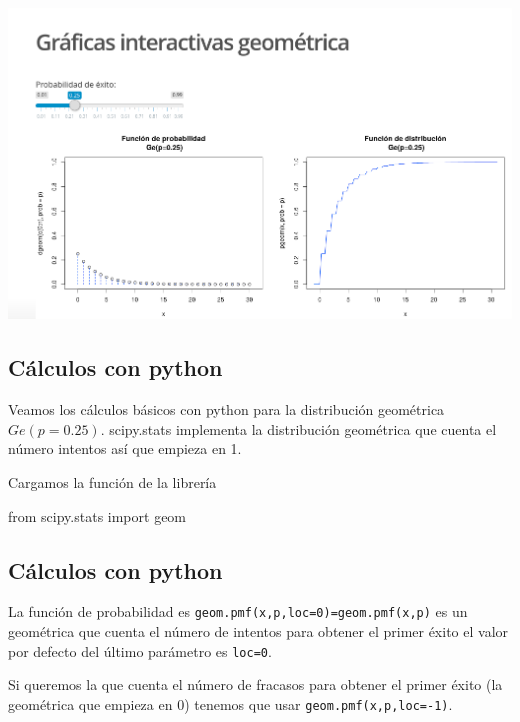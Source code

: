 \documentclass[]{book}
\newenvironment{Shaded}{\begin{snugshade}}{\end{snugshade}}
\newcommand{\ImportTok}[1]{#1}
\newcommand{\NormalTok}[1]{#1}
\begin{document}
\href{https://github.com/joanby/probabilidad}{\includegraphics{Images/noshinyImages/interactiva_geometrica1.png}}

\hypertarget{cuxe1lculos-con-python}{%
\subsection{Cálculos con python}\label{cuxe1lculos-con-python}}

Veamos los cálculos básicos con python para la distribución geométrica \(Ge(p=0.25)\). scipy.stats implementa la distribución geométrica que cuenta el número intentos así que empieza en 1.

Cargamos la función de la librería

\begin{Shaded}
\begin{Highlighting}[]
\ImportTok{from}\NormalTok{ scipy.stats }\ImportTok{import}\NormalTok{ geom}
\end{Highlighting}
\end{Shaded}

\hypertarget{cuxe1lculos-con-python-1}{%
\subsection{Cálculos con python}\label{cuxe1lculos-con-python-1}}

La función de probabilidad es \texttt{geom.pmf(x,p,loc=0)=geom.pmf(x,p)} es un geométrica que cuenta el número de intentos para obtener el primer éxito el valor por defecto del último parámetro es \texttt{loc=0}.

Si queremos la que cuenta el número de fracasos para obtener el primer éxito (la geométrica que empieza en 0) tenemos que usar \texttt{geom.pmf(x,p,loc=-1)}.
\end{document}
